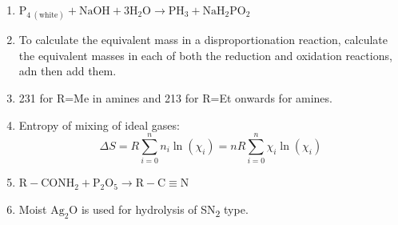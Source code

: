 \documentclass{article}
\numberwithin{equation}{section}
\numberwithin{figure}{section}
\newcommand{\Sub}[1]{\textsubscript{#1}}
\begin{document}
\begin{enumerate}
\begin{enumerate}
		\end{enumerate}
	\item $\mathrm{P_{4 \ (white)}+NaOH+ 3 H_2 O\rightarrow PH_3+ NaH_2 PO_2}$	
	\item To calculate the equivalent mass in a disproportionation reaction, calculate the equivalent masses in each of both the reduction and oxidation reactions, adn then add them.
	\item 231 for R=Me in amines and 213 for R=Et onwards for amines.
	\item Entropy of mixing of ideal gases:
		\begin{equation}
			\Delta S=R\sum_{i=0}^{n} n_i \ln(\chi_i)=nR\sum_{i=0}^{n}\chi_i\ln(\chi_i)
		\end{equation}
	\item $\mathrm{R-CONH_2+P_2 O_5} \rightarrow \mathrm{R-C\equiv N}$  
	\item Moist $\mathrm{Ag_{2} O}$ is used for hydrolysis of SN\Sub{2} type.
\end{enumerate}
\end{document}
